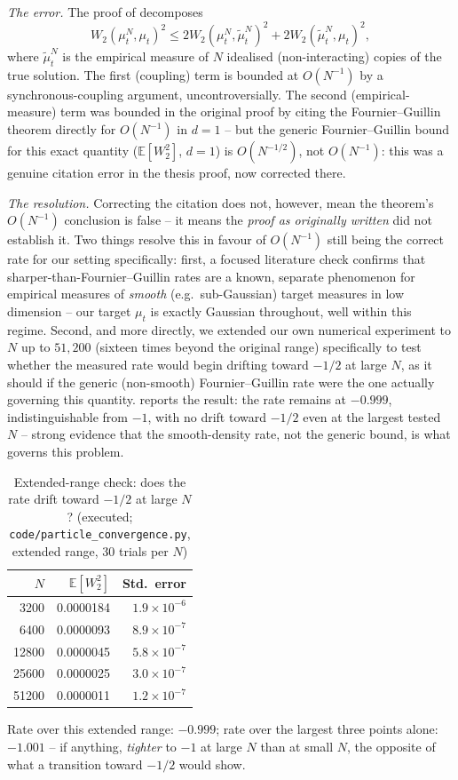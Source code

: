 \documentclass[11pt]{article}
\theoremstyle{remark}
\begin{document}
\emph{The error.} The proof of  decomposes
\[
    W_2(\mu_t^N,\mu_t)^2 \le 2W_2(\mu_t^N,\tilde\mu_t^N)^2 +
    2W_2(\tilde\mu_t^N,\mu_t)^2,
\]
where $\tilde\mu_t^N$ is the empirical measure of
$N$ idealised (non-interacting) copies of the true solution. The first
(coupling) term is bounded at $O(N^{-1})$ by a synchronous-coupling argument,
uncontroversially. The second (empirical-measure) term was bounded in the
original proof by citing the Fournier--Guillin theorem
\citep{fournierguillin2015} directly for $O(N^{-1})$ in $d=1$ -- but the
generic Fournier--Guillin bound for this exact quantity ($\mathbb{E}[W_2^2]$,
$d=1$) is $O(N^{-1/2})$, not $O(N^{-1})$: this was a genuine citation error in
the thesis proof, now corrected there.

\emph{The resolution.} Correcting the citation does not, however, mean the
theorem's $O(N^{-1})$ conclusion is false -- it means the \emph{proof as
originally written} did not establish it. Two things resolve this in favour of
$O(N^{-1})$ still being the correct rate for our setting specifically: first,
a focused literature check confirms that sharper-than-Fournier--Guillin rates
are a known, separate phenomenon for empirical measures of \emph{smooth}
(e.g.\ sub-Gaussian) target measures in low dimension -- our target $\mu_t$ is
exactly Gaussian throughout, well within this regime. Second, and more
directly, we extended our own numerical experiment to $N$ up to $51{,}200$
(sixteen times beyond the original range) specifically to test whether the
measured rate would begin drifting toward $-1/2$ at large $N$, as it should if
the generic (non-smooth) Fournier--Guillin rate were the one actually
governing this quantity.  reports the result: the
rate remains at $-0.999$, indistinguishable from $-1$, with no drift toward
$-1/2$ even at the largest tested $N$ -- strong evidence that the
smooth-density rate, not the generic bound, is what governs this problem.

\begin{table}[ht]
\centering
\caption{Extended-range check: does the rate drift toward $-1/2$ at large $N$?
(executed; \texttt{code/particle\_convergence.py}, extended range, 30 trials
per $N$)}
\label{tab:particle-extended}
\begin{tabular}{rrr}
\toprule
$N$ & $\mathbb{E}[W_2^2]$ & Std.\ error \\
\midrule
3200   & 0.0000184 & $1.9\times10^{-6}$ \\
6400   & 0.0000093 & $8.9\times10^{-7}$ \\
12800  & 0.0000045 & $5.8\times10^{-7}$ \\
25600  & 0.0000025 & $3.0\times10^{-7}$ \\
51200  & 0.0000011 & $1.2\times10^{-7}$ \\
\bottomrule
\end{tabular}
\end{table}
\noindent Rate over this extended range: $-0.999$; rate over the largest three
points alone: $-1.001$ -- if anything, \emph{tighter} to $-1$ at large $N$ than
at small $N$, the opposite of what a transition toward $-1/2$ would show.
\end{document}

